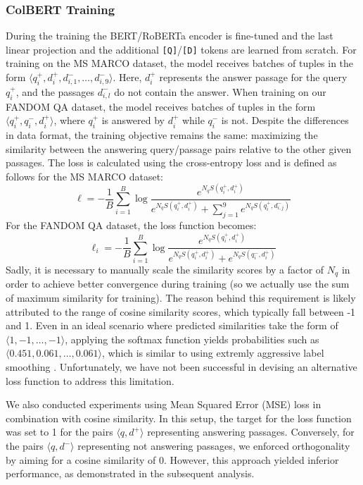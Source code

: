 \documentclass{article}
\begin{document}
\subsubsection{ColBERT Training}
During the training the BERT/RoBERTa encoder is fine-tuned and the last linear projection and the additional \texttt{[Q]}/\texttt{[D]} tokens are learned from scratch. For training on the MS MARCO \cite{bajaj2018ms} dataset, the model receives batches of tuples in the form $\langle q_i^+, d_i^+, d_{i, 1}^-, \dots, d_{i, 9}^-\rangle$. Here, $d_i^+$ represents the answer passage for the query $q_i^+$, and the passages $d_{i, l}^-$ do not contain the answer. When training on our FANDOM QA dataset, the model receives batches of tuples in the form $\langle q_i^+, q_i^-, d_i^+\rangle$, where $q_i^+$ is answered by $d_i^+$ while $q_i^-$ is not. Despite the differences in data format, the training objective remains the same: maximizing the similarity between the answering query/passage pairs relative to the other given passages. The loss is calculated using the cross-entropy loss and is defined as follows for the MS MARCO dataset:
$$
\ell = -\frac{1}{B} \sum_{i=1}^{B} \log \frac{e^{N_q S(q_i^+, d_i^+)}}{e^{N_q S(q_i^+, d_i^+)} + \sum_{j=1}^{9}{e^{N_q S(q_i^+, d_{i, j}^-)}}}
$$
For the FANDOM QA dataset, the loss function becomes:
$$
\ell_i = -\frac{1}{B} \sum_{i=1}^{B} \log \frac{e^{N_q S(q_i^+, d_i^+)}}{e^{N_q S(q_i^+, d_i^+)} + e^{N_q S(q_i^-, d_i^+)}}
$$
Sadly, it is necessary to manually scale the similarity scores by a factor of $N_q$ in order to achieve better convergence during training (so we actually use the sum of maximum similarity for training). The reason behind this requirement is likely attributed to the range of cosine similarity scores, which typically fall between -1 and 1. Even in an ideal scenario where predicted similarities take the form of $\langle 1, -1, \dots, -1\rangle$, applying the softmax function yields probabilities such as $\langle 0.451, 0.061, \dots, 0.061\rangle$, which is similar to using extremly aggressive label smoothing \cite{szegedy2015rethinking}. Unfortunately, we have not been successful in devising an alternative loss function to address this limitation.

We also conducted experiments using Mean Squared Error (MSE) loss in combination with cosine similarity. In this setup, the target for the loss function was set to 1 for the pairs $\langle q, d^+\rangle$ representing answering passages. Conversely, for the pairs $\langle q, d^-\rangle$ representing not answering passages, we enforced orthogonality by aiming for a cosine similarity of 0. However, this approach yielded inferior performance, as demonstrated in the subsequent analysis.
\end{document}
